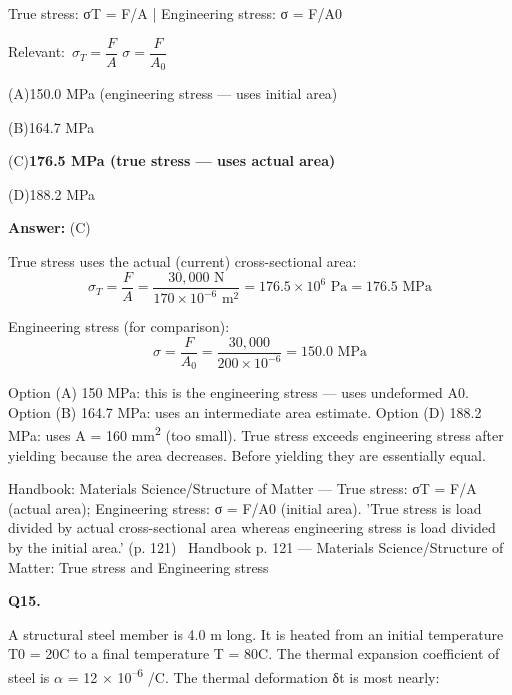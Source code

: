 \documentclass[11pt]{article}
\newcommand{\correct}[1]{\textbf{#1}\;{\color{accent}$\checkmark$}}
\newcommand{\optline}[2]{\par\noindent\hspace{1.2em}(#1)\hspace{0.6em}#2}
\begin{document}
True stress: σT = F/A  |  Engineering stress: σ = F/A0\par\vspace{3pt}
{\small\color{soft}Relevant:}\ $\sigma_T = \dfrac{F}{A}$ \quad $\sigma = \dfrac{F}{A_0}$\par\vspace{3pt}
\optline{A}{150.0 MPa (engineering stress --- uses initial area)}
\optline{B}{164.7 MPa}
\optline{C}{\correct{176.5 MPa (true stress --- uses actual area)}}
\optline{D}{188.2 MPa}
\par\vspace{3pt}
\vspace{2pt}\par\noindent\colorbox{boxbg}{\parbox{\dimexpr\linewidth-2\fboxsep\relax}{%
\vspace{2pt}\textbf{Answer:} (C)\par\vspace{2pt}
{\small True stress uses the actual (current) cross-sectional area:
\[\sigma_T = \frac{F}{A} = \frac{30{,}000\text{ N}}{170 \times 10^{-6}\text{ m}^2} = 176.5 \times 10^6\text{ Pa} = 176.5\text{ MPa}\]

Engineering stress (for comparison):
\[\sigma = \frac{F}{A_0} = \frac{30{,}000}{200 \times 10^{-6}} = 150.0\text{ MPa}\]

Option (A) 150 MPa: this is the engineering stress --- uses undeformed A0. Option (B) 164.7 MPa: uses an intermediate area estimate. Option (D) 188.2 MPa: uses A = 160 mm\textsuperscript{2} (too small). True stress exceeds engineering stress after yielding because the area decreases. Before yielding they are essentially equal.}\par\vspace{2pt}
{\footnotesize\color{soft}Handbook: Materials Science/Structure of Matter --- True stress: σT = F/A (actual area); Engineering stress: σ = F/A0 (initial area). 'True stress is load divided by actual cross-sectional area whereas engineering stress is load divided by the initial area.' (p. 121) \textbullet\ Handbook p. 121 --- Materials Science/Structure of Matter: True stress and Engineering stress}\vspace{2pt}
}}
\vspace{9pt}
\filbreak
\textbf{\color{accent}Q15.}\par\vspace{2pt}
A structural steel member is 4.0 m long. It is heated from an initial temperature T0 = 20\textdegree{}C to a final temperature T = 80\textdegree{}C. The thermal expansion coefficient of steel is $\alpha$ = 12 $\times$ 10\textsuperscript{--}\textsuperscript{6} /\textdegree{}C. The thermal deformation δt is most nearly:
\end{document}
